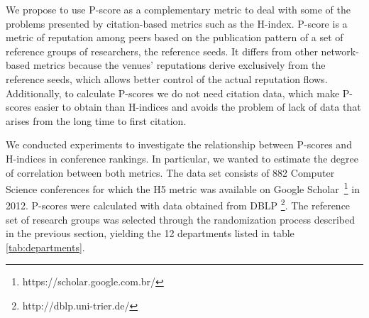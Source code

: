 \documentclass[man]{apa6}
\begin{document}
We propose to use P-score as a complementary metric to deal with some of the problems
presented by citation-based metrics such as the H-index.
P-score is a metric of reputation among peers based on the publication pattern of a set of
reference groups of researchers, the reference seeds. It differs from other network-based 
metrics because the venues' reputations derive exclusively from the reference seeds, which 
allows better control of the actual reputation flows. Additionally, to calculate P-scores we 
do not need citation data, which make P-scores easier to obtain than H-indices and avoids 
the problem of lack of data that arises from the long time to first citation.

We conducted experiments to investigate the relationship between P-scores and H-indices
in conference rankings. In particular, we wanted to estimate the degree of correlation between both metrics. The data set consists of 882 Computer Science conferences
for which the H5 metric was available on Google Scholar~\footnote{https://scholar.google.com.br/}
in 2012. P-scores were calculated with
data obtained from DBLP \footnote{http://dblp.uni-trier.de/}. The reference set of research groups
was selected through the randomization process described in the previous section, 
yielding the 12 departments listed in table \ref{tab:departments}.
\end{document}
